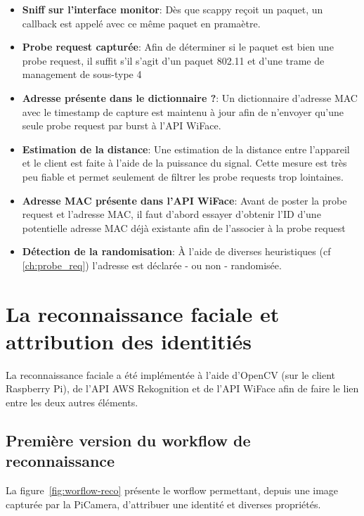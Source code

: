 \begin{itemize}
    \item \textbf{Sniff sur l'interface monitor}: Dès que scappy reçoit un paquet, un callback est appelé avec ce même paquet en pramaètre.
    \item \textbf{Probe request capturée}: Afin de déterminer si le paquet est bien une probe request, il suffit s'il s'agit d'un paquet 802.11 et d'une trame de management de sous-type 4
    \item \textbf{Adresse présente dans le dictionnaire ?}: Un dictionnaire d'adresse MAC avec le timestamp de capture est maintenu à jour afin de n'envoyer qu'une seule probe request par burst à l'API WiFace.
    \item \textbf{Estimation de la distance}: Une estimation de la distance entre l'appareil et le client est faite à l'aide de la puissance du signal. Cette mesure est très peu fiable et permet seulement de filtrer les probe requests trop lointaines.
    \item \textbf{Adresse MAC présente dans l'API WiFace}: Avant de poster la probe request et l'adresse MAC, il faut d'abord essayer d'obtenir l'ID d'une potentielle adresse MAC déjà existante afin de l'associer à la probe request
    \item \textbf{Détection de la randomisation}: À l'aide de diverses heuristiques (cf \ref{ch:probe_req}) l'adresse est déclarée - ou non - randomisée.
\end{itemize}

\section{La reconnaissance faciale et attribution des identitiés}

La reconnaissance faciale a été implémentée à l'aide d'OpenCV (sur le client Raspberry Pi), de l'API AWS Rekognition et de l'API WiFace
afin de faire le lien entre les deux autres éléments. 

\subsection{Première version du workflow de reconnaissance}

La figure~\ref{fig:worflow-reco} présente le worflow permettant, depuis une image capturée par la PiCamera, d'attribuer une identité et diverses propriétés.

\clearpage
\newpage

